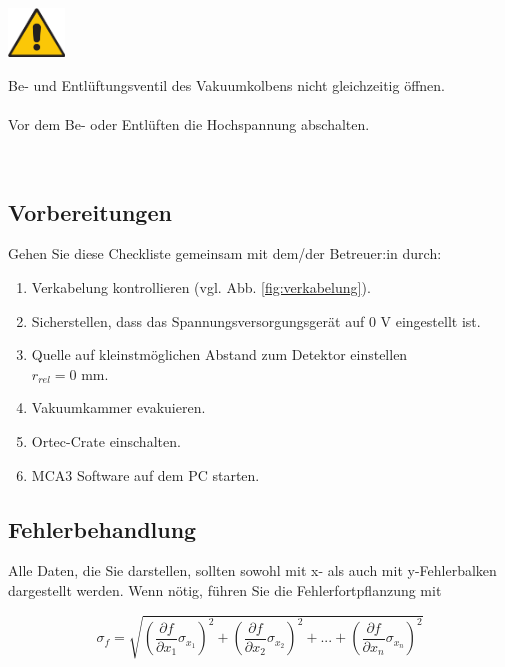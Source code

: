 \begin{minipage}[c]{.15\linewidth}
	\includegraphics[width=1.5cm]{img/attention}
\end{minipage}
\begin{minipage}[t]{.85\linewidth}
	Be- und Entlüftungsventil des Vakuumkolbens nicht gleichzeitig öffnen.
	\\ \\
	Vor dem Be- oder Entlüften die Hochspannung abschalten. 
\end{minipage}\vspace{1em}\\ 
%
\clearpage
%
\subsection{Vorbereitungen}
Gehen Sie diese Checkliste gemeinsam mit dem/der Betreuer:in durch:
\begin{enumerate}
	\item Verkabelung kontrollieren (vgl. Abb. \ref{fig:verkabelung}).
	\item Sicherstellen, dass das Spannungsversorgungsgerät auf $0$ V eingestellt ist.
	\item Quelle auf kleinstmöglichen Abstand zum Detektor einstellen \\$r_{rel} = 0$ mm.
	\item Vakuumkammer evakuieren.
	\item Ortec-Crate einschalten.
	\item MCA3 Software auf dem PC starten.
\end{enumerate}

%
\subsection{Fehlerbehandlung}
Alle Daten, die Sie darstellen, sollten sowohl mit x- als auch mit y-Fehlerbalken dargestellt werden. Wenn nötig, führen Sie die Fehlerfortpflanzung mit

\begin{equation}\label{eq:RSS}
		\sigma_{f} = \sqrt{\left( \frac{\partial f}{\partial x_1}\sigma_{x_1} \right)^2 + \left( \frac{\partial f}{\partial x_2}\sigma_{x_2} \right)^2 + ... + \left( \frac{\partial f}{\partial x_n}\sigma_{x_n} \right)^2} 
\end{equation}

